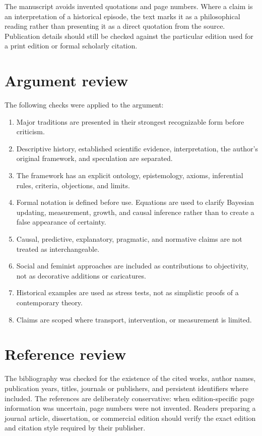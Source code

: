 The manuscript avoids invented quotations and page numbers. Where a claim is
an interpretation of a historical episode, the text marks it as a
philosophical reading rather than presenting it as a direct quotation from the
source. Publication details should still be checked against the particular
edition used for a print edition or formal scholarly citation.

\section{Argument review}

The following checks were applied to the argument:

\begin{enumerate}
\item Major traditions are presented in their strongest recognizable form
before criticism.
\item Descriptive history, established scientific evidence, interpretation,
the author's original framework, and speculation are separated.
\item The framework has an explicit ontology, epistemology, axioms, inferential
rules, criteria, objections, and limits.
\item Formal notation is defined before use. Equations are used to clarify
Bayesian updating, measurement, growth, and causal inference rather than to
create a false appearance of certainty.
\item Causal, predictive, explanatory, pragmatic, and normative claims are not
treated as interchangeable.
\item Social and feminist approaches are included as contributions to
objectivity, not as decorative additions or caricatures.
\item Historical examples are used as stress tests, not as simplistic proofs
of a contemporary theory.
\item Claims are scoped where transport, intervention, or measurement is
limited.
\end{enumerate}

\section{Reference review}

The bibliography was checked for the existence of the cited works, author
names, publication years, titles, journals or publishers, and persistent
identifiers where included. The references are deliberately conservative:
when edition-specific page information was uncertain, page numbers were not
invented. Readers preparing a journal article, dissertation, or commercial
edition should verify the exact edition and citation style required by their
publisher.

